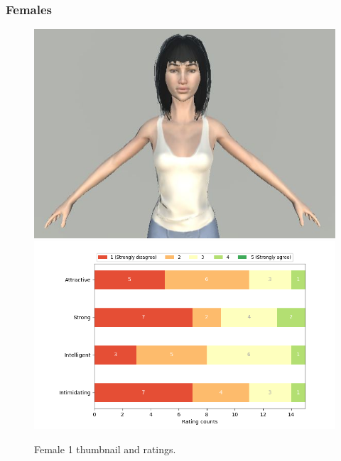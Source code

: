 \subsubsection{Females}
\begin{figure}[H]
  \includegraphics[width=\linewidth]{Images/Females/1.JPG}
\endminipage\hfill
{}
  \includegraphics[width=\linewidth]{Survey/FRatings/avatar_f1.png}
\endminipage\hfill
\caption{Female 1 thumbnail and ratings.}
\end{figure}

